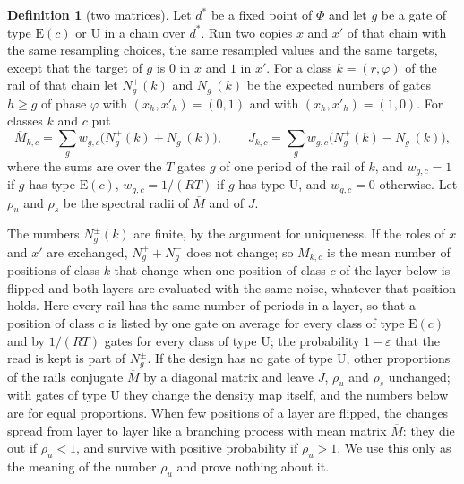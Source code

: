 \documentclass[11pt]{amsart}
\theoremstyle{definition}
\newtheorem{definition}[theorem]{Definition}
\theoremstyle{remark}
\newcommand{\eps}{\varepsilon}
\begin{document}
\begin{definition}[two matrices]\label{def:multipliers}
Let $d^*$ be a fixed point of $\Phi$ and let $g$ be a gate of type $\mathrm E(c)$ or $\mathrm U$ in
a chain over $d^*$. Run two copies $x$ and $x'$ of that chain with the same resampling choices,
the same resampled values and the same targets, except that the target of $g$ is $0$ in $x$ and
$1$ in $x'$. For a class $k=(r,\varphi)$ of the rail of that chain let $N^+_g(k)$ and $N^-_g(k)$ be the
expected numbers of gates $h\ge g$ of phase $\varphi$ with $(x_h,x'_h)=(0,1)$ and with
$(x_h,x'_h)=(1,0)$. For classes $k$ and $c$ put
\[
\overline M_{k,c}=\sum_{g}w_{g,c}\bigl(N^+_g(k)+N^-_g(k)\bigr),\qquad
J_{k,c}=\sum_{g}w_{g,c}\bigl(N^+_g(k)-N^-_g(k)\bigr),
\]
where the sums are over the $T$ gates $g$ of one period of the rail of $k$, and $w_{g,c}=1$ if $g$
has type $\mathrm E(c)$, $w_{g,c}=1/(RT)$ if $g$ has type $\mathrm U$, and $w_{g,c}=0$ otherwise.
Let $\rho_u$ and $\rho_s$ be the spectral radii of $\overline M$ and of $J$.
\end{definition}

\noindent The numbers $N^\pm_g(k)$ are finite, by the argument for uniqueness. If the roles of
$x$ and $x'$ are exchanged, $N^+_g+N^-_g$ does not change; so $\overline M_{k,c}$ is the mean
number of positions of class $k$ that change when one position of class $c$ of the layer below is
flipped and both layers are evaluated with the same noise, whatever that position holds. Here
every rail has the same number of periods in a layer, so that a position of class $c$ is listed by
one gate on average for every class of type $\mathrm E(c)$ and by $1/(RT)$ gates for every class
of type $\mathrm U$; the probability $1-\eps$ that the read is kept is part of $N^\pm_g$. If the
design has no gate of type $\mathrm U$, other proportions of the rails conjugate $\overline M$ by a
diagonal matrix and leave $J$, $\rho_u$ and $\rho_s$ unchanged; with gates of type $\mathrm U$
they change the density map itself, and the numbers below are for equal proportions. When few positions of a layer are flipped, the changes spread from layer
to layer like a branching process with mean matrix $\overline M$: they die out if $\rho_u<1$, and
survive with positive probability if $\rho_u>1$. We use this only as the meaning of the number
$\rho_u$ and prove nothing about it.
\end{document}
